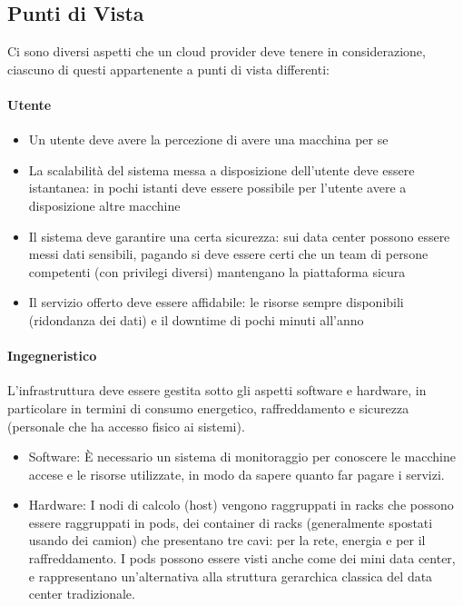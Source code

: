 \documentclass{article}
\begin{document}
		\subsection{Punti di Vista}
		Ci sono diversi aspetti che un cloud provider deve tenere in considerazione, ciascuno di questi appartenente a punti di vista differenti:
		\paragraph{Utente}
		\begin{itemize}
			\item Un utente deve avere la percezione di avere una macchina per se
			\item La scalabilità del sistema messa a disposizione dell'utente deve essere istantanea: in pochi istanti deve essere possibile per l'utente avere a disposizione altre macchine
			\item Il sistema deve garantire una certa sicurezza: sui data center possono essere messi dati sensibili, pagando si deve essere certi che un team di persone competenti (con privilegi diversi) mantengano la piattaforma sicura
			\item Il servizio offerto deve essere affidabile: le risorse sempre disponibili (ridondanza dei dati) e il downtime di pochi minuti all'anno
		\end{itemize}
		\paragraph{Ingegneristico}
		L'infrastruttura deve essere gestita sotto gli aspetti software e hardware, in particolare in termini di consumo energetico, raffreddamento e sicurezza (personale che ha accesso fisico ai sistemi).
		\begin{itemize}
		    \item Software: È necessario un sistema di monitoraggio per conoscere le macchine accese e le risorse utilizzate, in modo da sapere quanto far pagare i servizi.
		    \item Hardware: I nodi di calcolo (host) vengono raggruppati in racks che possono essere raggruppati in
		    pods, dei container di racks (generalmente spostati usando dei camion) che presentano tre cavi: 
		    per la rete, energia e per il raffreddamento. I pods possono essere visti anche come dei mini data center, e rappresentano un'alternativa alla struttura gerarchica classica del data center tradizionale.
		\end{itemize}
		
\end{document}
